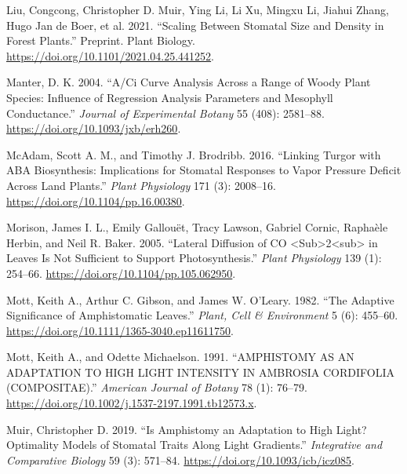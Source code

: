 \documentclass[12pt,halfline,a4paper,]{ouparticle}
\newlength{\cslhangindent}
\newlength{\cslentryspacingunit} %
\newenvironment{CSLReferences}[2] %
 {%
  \setlength{\parindent}{0pt}
  \ifodd #1
  \let\oldpar\par
  \def\par{\hangindent=\cslhangindent\oldpar}
  \fi
  \setlength{\parskip}{#2\cslentryspacingunit}
 }%
 {}
\begin{document}
\begin{CSLReferences}{1}{0}
\leavevmode{}%
Liu, Congcong, Christopher D. Muir, Ying Li, Li Xu, Mingxu Li, Jiahui
Zhang, Hugo Jan de Boer, et al. 2021. {``Scaling Between Stomatal Size
and Density in Forest Plants.''} Preprint. Plant Biology.
\url{https://doi.org/10.1101/2021.04.25.441252}.

\leavevmode{}%
Manter, D. K. 2004. {``A/{Ci} Curve Analysis Across a Range of Woody
Plant Species: Influence of Regression Analysis Parameters and Mesophyll
Conductance.''} \emph{Journal of Experimental Botany} 55 (408):
2581--88. \url{https://doi.org/10.1093/jxb/erh260}.

\leavevmode{}%
McAdam, Scott A. M., and Timothy J. Brodribb. 2016. {``Linking {Turgor}
with {ABA} {Biosynthesis}: {Implications} for {Stomatal} {Responses} to
{Vapor} {Pressure} {Deficit} Across {Land} {Plants}.''} \emph{Plant
Physiology} 171 (3): 2008--16.
\url{https://doi.org/10.1104/pp.16.00380}.

\leavevmode{}%
Morison, James I. L., Emily Gallouët, Tracy Lawson, Gabriel Cornic,
Raphaèle Herbin, and Neil R. Baker. 2005. {``Lateral {Diffusion} of {CO}
{\textless{}}Sub{\textgreater{}}2{\textless{}}sub{\textgreater{}} in
{Leaves} {Is} {Not} {Sufficient} to {Support} {Photosynthesis}.''}
\emph{Plant Physiology} 139 (1): 254--66.
\url{https://doi.org/10.1104/pp.105.062950}.

\leavevmode{}%
Mott, Keith A., Arthur C. Gibson, and James W. O'Leary. 1982. {``The
Adaptive Significance of Amphistomatic Leaves.''} \emph{Plant, Cell \&
Environment} 5 (6): 455--60.
\url{https://doi.org/10.1111/1365-3040.ep11611750}.

\leavevmode{}%
Mott, Keith A., and Odette Michaelson. 1991. {``{AMPHISTOMY} {AS} {AN}
{ADAPTATION} {TO} {HIGH} {LIGHT} {INTENSITY} {IN} {AMBROSIA}
{CORDIFOLIA} ({COMPOSITAE}).''} \emph{American Journal of Botany} 78
(1): 76--79. \url{https://doi.org/10.1002/j.1537-2197.1991.tb12573.x}.

\leavevmode{}%
Muir, Christopher D. 2019. {``Is {Amphistomy} an {Adaptation} to {High}
{Light}? {Optimality} {Models} of {Stomatal} {Traits} Along {Light}
{Gradients}.''} \emph{Integrative and Comparative Biology} 59 (3):
571--84. \url{https://doi.org/10.1093/icb/icz085}.


\end{CSLReferences}
\end{document}
